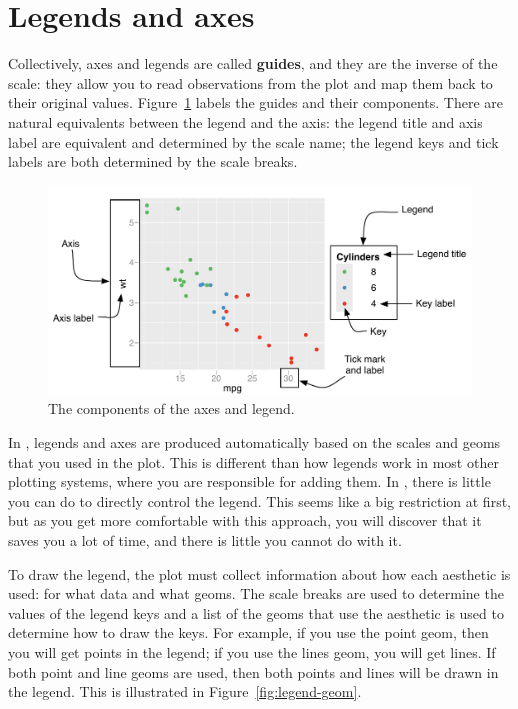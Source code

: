 \section{Legends and axes}
\label{sec:guides}

Collectively, axes and legends are called {\bf guides}, and they are the inverse of the scale: they allow you to read observations from the plot and map them back to their original values.  Figure~\ref{fig:labelled-guides} labels the guides and their components.  There are natural equivalents between the legend and the axis: the legend title and axis label are equivalent and determined by the scale name; the legend keys and tick labels are both determined by the scale breaks. 

\begin{figure}[htbp]
  \centering
  \includegraphics[width=\linewidth]{scale-guides}
  
  \caption{The components of the axes and legend.}
  \label{fig:labelled-guides}
\end{figure}

In \ggplot, legends and axes are produced automatically based on the scales and geoms that you used in the plot. This is different than how legends work in most other plotting systems, where you are responsible for adding them.  In \ggplot, there is little you can do to directly control the legend.   This seems like a big restriction at first, but as you get more comfortable with this approach, you will discover that it saves you a lot of time, and there is little you cannot do with it.

To draw the legend, the plot must collect information about how each aesthetic is used: for what data and what geoms. The scale breaks are used to determine the values of the legend keys and a list of the geoms that use the aesthetic  is used to determine how to draw the keys. For example, if you use the point geom, then you will get points in the legend; if you use the lines geom, you will get lines. If both point and line geoms are used, then both points and lines will be drawn in the legend.  This is illustrated in Figure~\ref{fig:legend-geom}.

